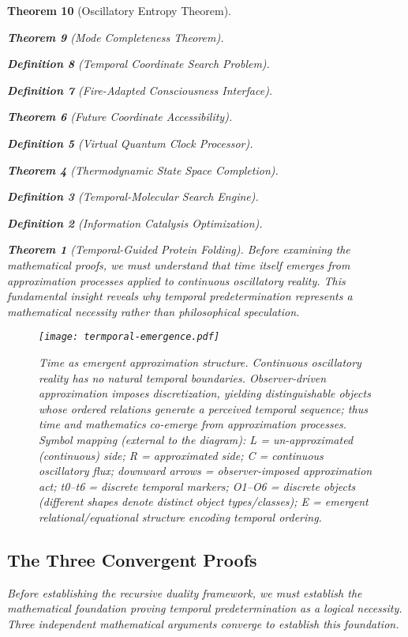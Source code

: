 \documentclass[12pt,a4paper]{article}
\newtheorem{theorem}{Theorem}[section]
\newtheorem{definition}[theorem]{Definition}
\begin{document}
\begin{theorem}[Oscillatory Entropy Theorem]
\begin{theorem}[Mode Completeness Theorem]
\begin{enumerate}
\begin{definition}[Temporal Coordinate Search Problem]
\begin{algorithm}
\begin{definition}[Fire-Adapted Consciousness Interface]
\begin{theorem}[Future Coordinate Accessibility]
\begin{definition}[Virtual Quantum Clock Processor]
\begin{itemize}
\begin{itemize}
\begin{theorem}[Thermodynamic State Space Completion]
\begin{definition}[Temporal-Molecular Search Engine]
\begin{definition}[Information Catalysis Optimization]
\begin{algorithm}
\begin{theorem}[Temporal-Guided Protein Folding]
\begin{table}[h]
Before examining the mathematical proofs, we must understand that time itself emerges from approximation processes applied to continuous oscillatory reality. This fundamental insight reveals why temporal predetermination represents a mathematical necessity rather than philosophical speculation.

\begin{figure}[h]
\centering
\texttt{[image: termporal-emergence.pdf]}
\caption{Time as emergent approximation structure. Continuous oscillatory reality has no natural temporal boundaries. Observer-driven approximation imposes discretization, yielding distinguishable objects whose ordered relations generate a perceived temporal sequence; thus time and mathematics co-emerge from approximation processes. Symbol mapping (external to the diagram): L = un-approximated (continuous) side; R = approximated side; C = continuous oscillatory flux; downward arrows = observer-imposed approximation act; t0–t6 = discrete temporal markers; O1–O6 = discrete objects (different shapes denote distinct object types/classes); E = emergent relational/equational structure encoding temporal ordering.}
\label{fig:temporal-emergence}
\end{figure}


\subsection{The Three Convergent Proofs}

Before establishing the recursive duality framework, we must establish the mathematical foundation proving temporal predetermination as a logical necessity. Three independent mathematical arguments converge to establish this foundation.


\end{table}
\end{theorem}
\end{algorithm}
\end{definition}
\end{definition}
\end{theorem}
\end{itemize}
\end{itemize}
\end{definition}
\end{theorem}
\end{definition}
\end{algorithm}
\end{definition}
\end{enumerate}
\end{theorem}
\end{theorem}
\end{document}
